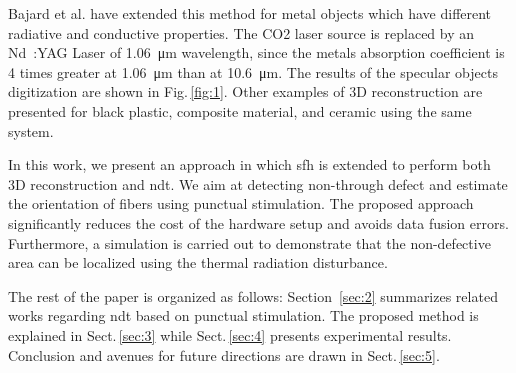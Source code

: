 Bajard et al.\cite{Bajard2012} have extended this method for metal objects which have different radiative and conductive properties. The CO2 laser source is replaced by an Nd~:YAG Laser of \SI{1.06}{\micro \metre} wavelength, since the metals absorption coefficient is 4 times greater at \SI{1.06}{\micro \metre} than at \SI{10.6}{\micro \metre}. The results of the specular objects digitization are shown in Fig.\,\ref{fig:1}. Other examples of 3D reconstruction are presented for black plastic, composite material, and ceramic using the same system.

In this work, we present an approach in which \ac{sfh} is extended to perform both 3D reconstruction and \ac{ndt}. We aim at detecting non-through defect and estimate the orientation of fibers using punctual stimulation. The proposed approach significantly reduces the cost of the hardware setup and avoids data fusion errors. Furthermore, a simulation is carried out to demonstrate that the non-defective area can be localized using the thermal radiation disturbance.

The rest of the paper is organized as follows: Section~\ref{sec:2} summarizes related works regarding \ac{ndt} based on punctual stimulation. The proposed method is explained in Sect.\,\ref{sec:3} while Sect.\,\ref{sec:4} presents experimental results. Conclusion and avenues for future directions are drawn in Sect.\,\ref{sec:5}.



